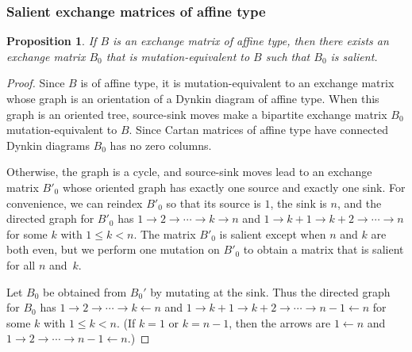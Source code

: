 \documentclass{amsart}
\newtheorem{proposition}{Proposition}[section]
\theoremstyle{definition}
\theoremstyle{remark}
\numberwithin{equation}{section}
\newcommand{\0}{{\mathbf{0}}}
\begin{document}
\subsubsection{Salient exchange matrices of affine type}
\begin{proposition}\label{affine salient}
If $B$ is an exchange matrix of affine type, then there exists an exchange matrix $B_0$ that is mutation-equivalent to $B$ such that $B_0$ is salient.
\end{proposition}
\begin{proof}
Since $B$ is of affine type, it is mutation-equivalent to an exchange matrix whose graph is an orientation of a Dynkin diagram of affine type.
When this graph is an oriented tree, source-sink moves make a bipartite exchange matrix $B_0$ mutation-equivalent to $B$.
Since Cartan matrices of affine type have connected Dynkin diagrams $B_0$ has no zero columns.

Otherwise, the graph is a cycle, and source-sink moves lead to an exchange matrix $B'_0$ whose oriented graph has exactly one source and exactly one sink.
For convenience, we can reindex $B'_0$ so that its source is $1$, the sink is $n$, and the directed graph for $B'_0$ has ${1\to2\to\cdots\to k\to n}$ and $1\to k+1\to k+2\to\cdots\to n$ for some $k$ with $1\le k<n$.
The matrix $B'_0$ is salient except when $n$ and $k$ are both even, but we perform one mutation on $B'_0$ to obtain a matrix that is salient for all $n$ and~$k$.

Let $B_0$ be obtained from $B_0'$ by mutating at the sink.
Thus the directed graph for $B_0$ has ${1\to2\to\cdots\to k\leftarrow n}$ and $1\to k+1\to k+2\to\cdots\to n-1\leftarrow n$ for some $k$ with $1\le k<n$.
(If $k=1$ or $k=n-1$, then the  arrows are $1\leftarrow n$ and $1\to2\to\cdots\to n-1\leftarrow n$.)


\end{proof}
\end{document}
